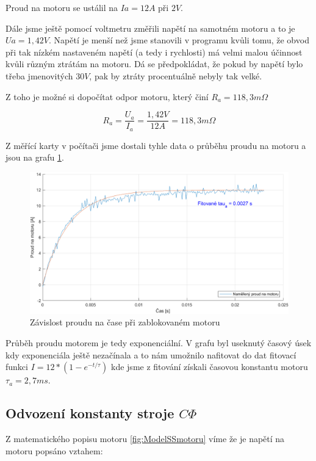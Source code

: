 \documentclass{protokol}
\begin{document}
Proud na motoru se ustálil na $Ia = 12A$ při $2V$. 

Dále jsme ještě pomocí voltmetru změřili napětí na samotném motoru a to je $Ua = 1,42V$. Napětí je menší než jsme stanovili v programu kvůli tomu, že obvod při tak nízkém nastaveném napětí (a tedy i rychlosti) má velmi malou účinnost kvůli různým ztrátám na motoru. Dá se předpokládat, že pokud by napětí bylo třeba jmenovitých $30V$, pak by ztráty procentuálně nebyly tak velké.

Z toho je možné si dopočítat odpor motoru, který činí $R_a = 118,3 m\Omega$

\begin{equation}
    R_a = \frac{U_a}{I_a} = \frac{1,42V}{12A} = 118,3m\Omega
    \label{eq:VypocetOdporuMotoru}
\end{equation}

Z měřící karty v počítači jsme dostali tyhle data o průběhu proudu na motoru a jsou na grafu \ref{fig:proudovaExponenciala}.
\begin{figure}[H]
    \centering
    \includegraphics[width=1\linewidth]{proudovaExponenciala.png}
    \caption{Závislost proudu na čase při zablokovaném motoru}
    \label{fig:proudovaExponenciala}
\end{figure}

Průběh proudu motorem je tedy exponenciální. V grafu byl useknutý časový úsek kdy exponenciála ještě nezačínala a to nám umožnilo nafitovat do dat fitovací funkci $I = 12*(1-e^{-t/\tau{}})$ kde jsme z fitování získali časovou konstantu motoru $\tau_a = 2,7 ms$.

\subsection{Odvození konstanty stroje $C\Phi{}$}
Z matematického popisu motoru \ref{fig:ModelSSmotoru} víme že je napětí na motoru popsáno vztahem:
\end{document}
